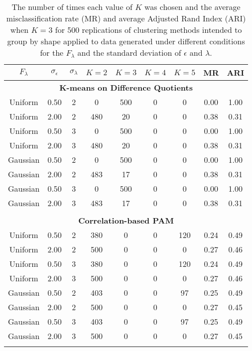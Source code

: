 \begin{table}[ht]
\centering
\begin{tabular}{ccc|cccccc}
  \thickhline $F_{\lambda}$&$\sigma_{\epsilon}$&$\sigma_{\lambda}$&$K=2$&$K=3$&$K=4$&$K=5$&MR&ARI\\  \hline\multicolumn{9}{c}{\textbf{K-means on Difference Quotients}}\\ Uniform & 0.50 &   2 &   0 & 500 &   0 &   0 & 0.00 & 1.00 \\ 
  Uniform & 2.00 &   2 & 480 &  20 &   0 &   0 & 0.38 & 0.31 \\ 
  Uniform & 0.50 &   3 &   0 & 500 &   0 &   0 & 0.00 & 1.00 \\ 
  Uniform & 2.00 &   3 & 480 &  20 &   0 &   0 & 0.38 & 0.31 \\ 
  Gaussian & 0.50 &   2 &   0 & 500 &   0 &   0 & 0.00 & 1.00 \\ 
  Gaussian & 2.00 &   2 & 483 &  17 &   0 &   0 & 0.38 & 0.31 \\ 
  Gaussian & 0.50 &   3 &   0 & 500 &   0 &   0 & 0.00 & 1.00 \\ 
  Gaussian & 2.00 &   3 & 483 &  17 &   0 &   0 & 0.38 & 0.31 \\ 
   \\ \multicolumn{9}{c}{\textbf{Correlation-based PAM}}\\Uniform & 0.50 &   2 & 380 &   0 &   0 & 120 & 0.24 & 0.49 \\ 
  Uniform & 2.00 &   2 & 500 &   0 &   0 &   0 & 0.27 & 0.46 \\ 
  Uniform & 0.50 &   3 & 380 &   0 &   0 & 120 & 0.24 & 0.49 \\ 
  Uniform & 2.00 &   3 & 500 &   0 &   0 &   0 & 0.27 & 0.46 \\ 
  Gaussian & 0.50 &   2 & 403 &   0 &   0 &  97 & 0.25 & 0.49 \\ 
  Gaussian & 2.00 &   2 & 500 &   0 &   0 &   0 & 0.27 & 0.45 \\ 
  Gaussian & 0.50 &   3 & 403 &   0 &   0 &  97 & 0.25 & 0.49 \\ 
  Gaussian & 2.00 &   3 & 500 &   0 &   0 &   0 & 0.27 & 0.45 \\ 
   \thickhline\end{tabular}
\caption{The number of times each value of $K$ was chosen and the average misclassification rate (MR) and average Adjusted Rand Index (ARI) when $K=3$ for 500 replications of clustering methods intended to group by shape applied to data generated under different conditions for the $F_{\lambda}$ and the standard deviation of $\epsilon$ and $\lambda$.}
\label{tab:freq2}

\end{table}


